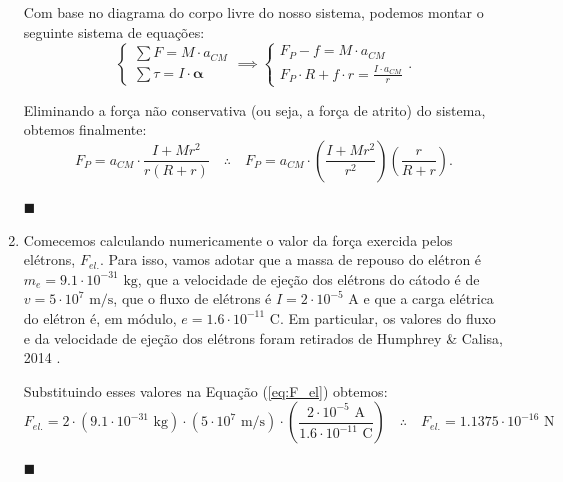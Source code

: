 \documentclass[12pt,a4paper]{article}
\begin{document}
\begin{enumerate}
    Com base no diagrama do corpo livre do nosso sistema, podemos montar o seguinte sistema de equações:
    \begin{equation}
        \begin{cases}
            \sum F=M\cdot a_{CM}\\
            \sum\tau=I\cdot\boldsymbol{\alpha}
        \end{cases}\implies
        \begin{cases}
            F_{P}-f=M\cdot a_{CM}\\
            F_{P}\cdot R+f\cdot r=\frac{I\cdot a_{CM}}{r}
        \end{cases}.
    \end{equation}

    Eliminando a força não conservativa (ou seja, a força de atrito) do sistema, obtemos finalmente:
    \begin{equation} \label{eq:F_P}
        F_{P}=a_{CM}\cdot\frac{I+Mr^{2}}{r\left(R+r\right)}\quad\therefore\quad \boxed{F_{P}=a_{CM}\cdot\left(\frac{I+Mr^{2}}{r^{2}}\right)\left(\frac{r}{R+r}\right)}.
    \end{equation}
    \begin{flushright}
        $\blacksquare$
    \end{flushright}

    
    
    

    \item  Comecemos calculando numericamente o valor da força exercida pelos elétrons, $F_{el.}$. Para isso, vamos adotar que a massa de repouso do elétron é $m_e=9.1\cdot10^{-31}\text{ kg}$, que a velocidade de ejeção dos elétrons do cátodo é de $v=5\cdot10^{7}\text{ m/s}$, que o fluxo de elétrons é $I=2\cdot10^{-5}\text{ A}$ e que a carga elétrica do elétron é, em módulo, $e=1.6\cdot10^{-11}\text{ C}$. Em particular, os valores do fluxo e da velocidade de ejeção dos elétrons foram retirados de Humphrey \& Calisa, 2014 \cite{Humphrey_Calisa_2014}.

    Substituindo esses valores na Equação (\ref{eq:F_el}) obtemos:
    \begin{equation} \label{eq:F_el - value}
        F_{el.}=2\cdot(9.1\cdot10^{-31}\text{ kg})\cdot(5\cdot10^{7}\text{ m/s})\cdot\left(\frac{2\cdot10^{-5}\text{ A}}{1.6\cdot10^{-11}\text{ C}}\right) \quad\therefore\quad\boxed{F_{el.}=1.1375\cdot10^{-16}\text{ N}}
    \end{equation}
    \begin{flushright}
        $\blacksquare$
    \end{flushright}


\end{enumerate}
\end{document}
